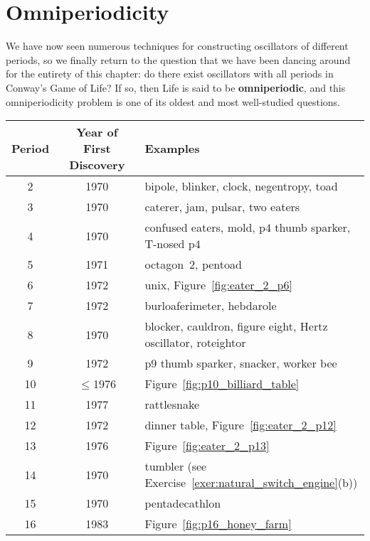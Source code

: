 \section{Omniperiodicity}\label{sec:omniperiodic}

We have now seen numerous techniques for constructing oscillators of different periods, so we finally return to the question that we have been dancing around for the entirety of this chapter: do there exist oscillators with all periods in Conway's Game of Life? If so, then Life is said to be \textbf{omniperiodic}, and this omniperiodicity problem is one of its oldest and most well-studied questions.

\begin{table}[!htb]\vspace*{0.05in}
	\begin{center}		
		\begin{tabular}{c c l}
			\toprule
			Period & Year of First Discovery & Examples \\ \midrule
			2 & 1970 & bipole, blinker, clock, negentropy, toad \\
			\rowcolor{gray!20} 3 & 1970 & caterer, jam, pulsar, two eaters \\
			4 & 1970 & confused eaters, mold, p$4$ thumb sparker, T-nosed p$4$ \\
			\rowcolor{gray!20} 5 & 1971 & octagon~2, pentoad \\
			6 & 1972 & unix, Figure~\ref{fig:eater_2_p6} \\
			\rowcolor{gray!20} 7 & 1972 & burloaferimeter, hebdarole \\
			8 & 1970 & blocker, cauldron, figure eight, Hertz oscillator, roteightor \\
			\rowcolor{gray!20} 9 & 1972 & p$9$ thumb sparker, snacker, worker bee \\
			10 & $\leq$1976 & Figure~\ref{fig:p10_billiard_table} \\
			\rowcolor{gray!20} 11 & 1977 & rattlesnake \\
			12 & 1972 & dinner table, Figure~\ref{fig:eater_2_p12} \\
			\rowcolor{gray!20} 13 & 1976 & Figure~\ref{fig:eater_2_p13} \\
			14 & 1970 & tumbler (see Exercise~\ref{exer:natural_switch_engine}(b)) \\
			\rowcolor{gray!20} 15 & 1970 & pentadecathlon \\
			16 & 1983 & Figure~\ref{fig:p16_honey_farm} \\

\end{tabular}
\end{center}
\end{table}
